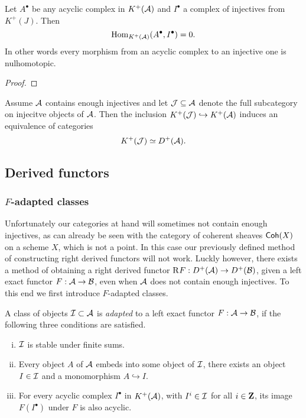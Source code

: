 \begin{lemma}
    Let $A^\bullet$ be any acyclic complex in $K^+(\mathcal A)$ and $I^\bullet$ a complex of injectives from $K^+(J)$. Then
    \[
        \operatorname{Hom}_{K^+(\mathcal A)}(A^\bullet, I^\bullet) = 0.
    \]
    In other words every morphism from an acyclic complex to an injective one is nulhomotopic.
\end{lemma}

\begin{proof}
    
\end{proof}

\begin{theorem}
    Assume $\mathcal A$ contains enough injectives and let $\mathcal J \subseteq \mathcal A$ denote the full subcategory on injecitve objects of $\mathcal A$. Then the inclusion $K^+(\mathcal J) \hookrightarrow K^+(\mathcal A)$ induces an equivalence of categories
    \[
        K^+(\mathcal J) \simeq D^+(\mathcal A).
    \]
\end{theorem}

\subsection{Derived functors}

\subsubsection{$F$-adapted classes}
\label{Subsection on F-adapted classes}

Unfortunately our categories at hand will sometimes not contain enough injectives, as can already be seen with the category of coherent sheaves $\textsf{Coh}(X)$ on a scheme $X$, which is not a point. In this case our previously defined method of constructing right derived functors will not work. Luckly however, there exists a method of obtaining a right derived functor $\text{R}^{}F : D^+(\mathcal A) \to D^+(\mathcal B)$, given a left exact functor $F: \mathcal A \to \mathcal B$, even when $\mathcal A$ does not contain enough injectives. To this end we first introduce $F$-adapted classes.

\begin{definition}
    \label{F-adapted}
    A class of objects $\mathcal I \subset \mathcal A$ is \emph{adapted} to a left exact functor $F : \mathcal A \to \mathcal B$, if the following three conditions are satisfied.
    \begin{enumerate}[(i)]
        \item $\mathcal I$ is stable under finite sums. 
        \item Every object $A$ of $\mathcal A$ embeds into some object of $\mathcal I$, \ie there exists an object $I \in \mathcal I$ and a monomorphism $A \hookrightarrow I$.
        \item For every acyclic complex $I^\bullet$ in $K^+(\mathcal A)$, with $I^i \in \mathcal I$ for all $i \in \mathbf Z$, its image $F(I^\bullet)$ under $F$ is also acyclic.
    \end{enumerate}
\end{definition}

